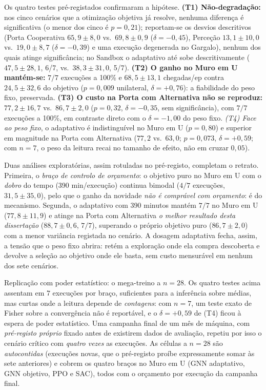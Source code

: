 \documentclass[12pt,reqno, twoside]{amsbook}
\makeatletter
\def\paragraph{\@startsection{paragraph}{4}%
  \z@\z@{-\fontdimen2\font}%
  {\normalfont\bfseries}}
\theoremstyle{plain}
\numberwithin{equation}{chapter}
\numberwithin{section}{chapter}
\numberwithin{table}{chapter}
\numberwithin{figure}{chapter}
\makeatother
\begin{document}
Os quatro testes pré-registados confirmaram a hipótese. \textbf{(T1) Não-degradação:} nos cinco cenários que a otimização objetiva já resolve, nenhuma diferença é significativa (o menor dos cinco é $p = 0{,}21$); reportam-se os desvios descritivos (Porta Cooperativa $65{,}9 \pm 8{,}0$ vs.\ $69{,}8 \pm 0{,}9$ ($\delta=-0{,}45$), Perceção $13{,}1 \pm 10{,}0$ vs.\ $19{,}0 \pm 8{,}7$ ($\delta=-0{,}39$) e uma execução degenerada no Gargalo), nenhum dos quais atinge significância; no Sandbox o adaptativo até sobe descritivamente ($47{,}5 \pm 28{,}1$, 6/7, vs.\ $38{,}3 \pm 31{,}0$, 5/7). \textbf{(T2) O ganho no Muro em U mantém-se:} $7/7$ execuções a 100\% e $68{,}5 \pm 13{,}1$ chegadas/ep contra $24{,}5 \pm 32{,}6$ do objetivo ($p=0{,}009$ unilateral, $\delta=+0{,}76$): a fiabilidade do peso fixo, preservada. \textbf{(T3) O custo na Porta com Alternativa não se reproduz:} $77{,}2 \pm 16{,}7$ vs.\ $86{,}7 \pm 2{,}0$ ($p=0{,}32$, $\delta=-0{,}35$, sem significância), com $7/7$ execuções a 100\%, em contraste direto com o $\delta=-1{,}00$ do peso fixo. \emph{(T4) Face ao peso fixo}, o adaptativo é indistinguível no Muro em U ($p=0{,}80$) e superior em magnitude na Porta com Alternativa ($77{,}2$ vs.\ $63{,}0$; $p=0{,}073$, $\delta=+0{,}59$; com $n=7$, o peso da leitura recai no tamanho de efeito, não em cruzar $0{,}05$).

Duas análises exploratórias, assim rotuladas no pré-registo, completam o retrato. Primeira, o \emph{braço de controlo de orçamento}: o objetivo puro no Muro em U com o \emph{dobro} do tempo (390 min/execução) continua bimodal ($4/7$ execuções, $31{,}5 \pm 35{,}0$), pelo que o ganho da novidade \emph{não é comprável com orçamento}: é do mecanismo. Segunda, o adaptativo com 390 minutos mantém $7/7$ no Muro em U ($77{,}8 \pm 11{,}9$) e atinge na Porta com Alternativa \emph{o melhor resultado desta dissertação} ($88{,}7 \pm 0{,}6$, $7/7$), superando o próprio objetivo puro ($86{,}7 \pm 2{,}0$) com a menor variância registada no cenário. A dosagem adaptativa fecha, assim, a tensão que o peso fixo abrira: retém a exploração onde ela compra descoberta e devolve a seleção ao objetivo onde ele basta, sem custo mensurável em nenhum dos sete cenários.

\paragraph{Replicação com poder estatístico: o mega-treino a $n=28$.} Os quatro testes acima assentam em $7$ execuções por braço, suficientes para a inferência sobre médias, mas curtas onde a leitura depende de \emph{contagens}: com $n=7$, um teste exato de Fisher sobre a convergência não é reportável, e o $\delta = +0{,}59$ de (T4) ficou à espera de poder estatístico. Uma campanha final de um mês de máquina, com \emph{pré-registo próprio} fixado antes de existirem dados de avaliação, repetiu por isso o cenário crítico com \emph{quatro vezes} as execuções. As células a $n=28$ são \emph{autocontidas} (execuções novas, que o pré-registo proíbe expressamente somar às sete anteriores) e cobrem os quatro braços no Muro em U (GNN adaptativo, GNN objetivo, PPO e SAC), todos com o orçamento por execução da campanha final.
\end{document}
